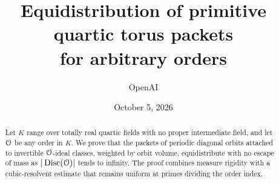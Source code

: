 \documentclass[11pt]{article}
\title{Equidistribution of primitive quartic torus packets\\for arbitrary orders}
\author{OpenAI}
\date{October 5, 2026}
\begin{document}
\maketitle
\begin{abstract}
Let $K$ range over totally real quartic fields with no proper intermediate field, and let $\mathcal O$ be any order in $K$. We prove that the packets of periodic diagonal orbits attached to invertible $\mathcal O$-ideal classes, weighted by orbit volume, equidistribute with no escape of mass as $|\operatorname{Disc}(\mathcal O)|$ tends to infinity. The proof combines measure rigidity with a cubic-resolvent estimate that remains uniform at primes dividing the order index.
\end{abstract}
\tableofcontents











\end{document}
